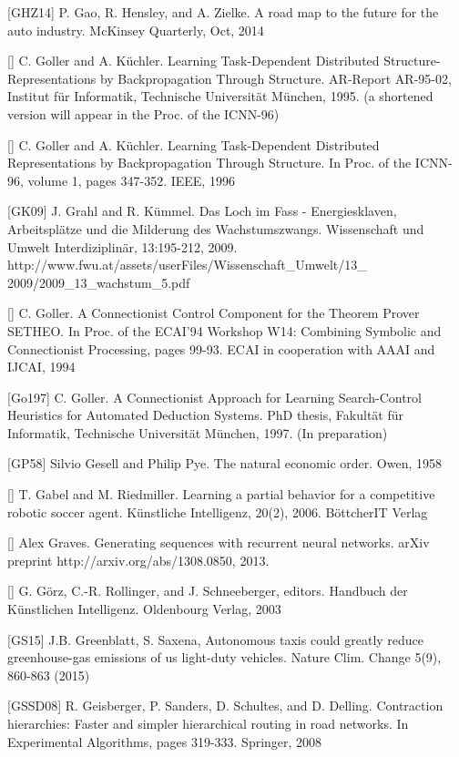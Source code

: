 \documentclass[10pt]{book}
\begin{document}
\begin{center}
[GHZ14] P. Gao, R. Hensley, and A. Zielke. A road map to the future for the auto industry. McKinsey Quarterly, Oct, 2014

[\cite{gk95}] C. Goller and A. Küchler. Learning Task-Dependent Distributed Structure-Representations by Backpropagation Through Structure. AR-Report AR-95-02, Institut für Informatik, Technische Universität München, 1995. (a shortened version will appear in the Proc. of the ICNN-96)

[\cite{gk96}] C. Goller and A. Küchler. Learning Task-Dependent Distributed Representations by Backpropagation Through Structure. In Proc. of the ICNN-96, volume 1, pages 347-352. IEEE, 1996

[GK09] J. Grahl and R. Kümmel. Das Loch im Fass - Energiesklaven, Arbeitsplätze und die Milderung des Wachstumszwangs. Wissenschaft und Umwelt Interdiziplinär, 13:195-212, 2009. http://www.fwu.at/assets/userFiles/Wissenschaft_Umwelt/13_ 2009/2009_13_wachstum_5.pdf

[\cite{gol94}] C. Goller. A Connectionist Control Component for the Theorem Prover SETHEO. In Proc. of the ECAI'94 Workshop W14: Combining Symbolic and Connectionist Processing, pages 99-93. ECAI in cooperation with AAAI and IJCAI, 1994

[Go197] C. Goller. A Connectionist Approach for Learning Search-Control Heuristics for Automated Deduction Systems. PhD thesis, Fakultät für Informatik, Technische Universität München, 1997. (In preparation)

[GP58] Silvio Gesell and Philip Pye. The natural economic order. Owen, 1958

[\cite{gr06}] T. Gabel and M. Riedmiller. Learning a partial behavior for a competitive robotic soccer agent. Künstliche Intelligenz, 20(2), 2006. BöttcherIT Verlag

[\cite{gra13}] Alex Graves. Generating sequences with recurrent neural networks. arXiv preprint http://arxiv.org/abs/1308.0850, 2013.

[\cite{grs03}] G. Görz, C.-R. Rollinger, and J. Schneeberger, editors. Handbuch der Künstlichen Intelligenz. Oldenbourg Verlag, 2003

[GS15] J.B. Greenblatt, S. Saxena, Autonomous taxis could greatly reduce greenhouse-gas emissions of us light-duty vehicles. Nature Clim. Change 5(9), 860-863 (2015)

[GSSD08] R. Geisberger, P. Sanders, D. Schultes, and D. Delling. Contraction hierarchies: Faster and simpler hierarchical routing in road networks. In Experimental Algorithms, pages 319-333. Springer, 2008


\end{center}
\end{document}
